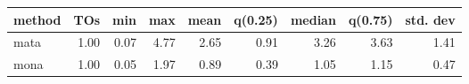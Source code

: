 \begin{tabular}{lrrrrrrrr}
\hline
 method   &   TOs &   min &   max &   mean &   q(0.25) &   median &   q(0.75) &   std. dev \\
\hline
 mata     &  1.00 &  0.07 &  4.77 &   2.65 &      0.91 &     3.26 &      3.63 &       1.41 \\
 mona     &  1.00 &  0.05 &  1.97 &   0.89 &      0.39 &     1.05 &      1.15 &       0.47 \\
\hline
\end{tabular}
